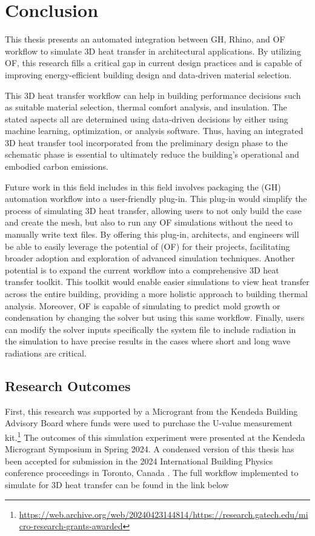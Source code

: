 \chapter{Conclusion}
This thesis presents an automated integration between  \gls{GH}, Rhino, and \gls{OF} workflow to simulate 3D heat transfer in architectural applications. 
By utilizing \gls{OF}, this research fills a critical gap in current design practices and is capable of improving energy-efficient building design and data-driven material selection. 

This 3D heat transfer workflow can help in building performance decisions such as suitable material selection, thermal comfort analysis, and insulation.
The stated aspects all are determined using data-driven decisions by either using machine learning, optimization, or analysis software. Thus, having an integrated 3D heat transfer tool incorporated from the preliminary design phase to the schematic phase is essential to ultimately reduce the building's operational and embodied carbon emissions. 

Future work in this field includes in this field involves packaging the (\gls{GH}) automation workflow into a user-friendly plug-in. This plug-in would simplify the process of simulating 3D heat transfer, allowing users to not only build the case and create the mesh, but also to run any \gls{OF} simulations without the need to manually write text files. By offering this plug-in, architects, and engineers will be able to easily leverage the potential of (\gls{OF}) for their projects, facilitating broader adoption and exploration of advanced simulation techniques. Another potential is to expand the current workflow into a comprehensive 3D heat transfer toolkit. This toolkit would enable easier simulations to view heat transfer across the entire building, providing a more holistic approach to building thermal analysis. Moreover, \gls{OF} is capable of simulating to predict mold growth or condensation by changing the solver but using this same workflow. Finally, users can modify the solver inputs specifically the system file to include radiation in the simulation to have precise results in the cases where short and long wave radiations are critical. 








\section*{Research Outcomes}
First, this research was supported by a Microgrant from the Kendeda Building Advisory Board  \cite{kendeda} where funds were used to purchase the U-value measurement kit.\footnote{\url{https://web.archive.org/web/20240423144814/https://research.gatech.edu/micro-research-grants-awarded}}
The outcomes of this simulation experiment were presented at the Kendeda Microgrant Symposium in Spring 2024. 
A condensed version of this thesis has been accepted for submission in the 2024 International Building Physics conference proceedings in Toronto, Canada \cite{ibpc}. The full workflow implemented to simulate for 3D heat transfer can be found in the link below

